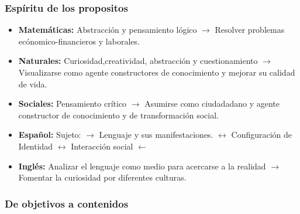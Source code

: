 \documentclass{beamer}
\begin{document}
\begin{frame}
\frametitle{Esp\'iritu de los propositos}
\begin{itemize}
\item \textbf{Matem\'aticas:} Abstracci\'on y pensamiento l\'ogico $\rightarrow$ Resolver problemas ec\'onomico-financieros y laborales. 
\item \textbf{Naturales: } Curiosidad,creatividad, abstracci\'on y cuestionamiento $\rightarrow$  Visualizarse como agente constructores de conocimiento y mejorar su calidad de vida. 
\item \textbf{Sociales:} Pensamiento cr\'itico $\rightarrow$ Asumirse como ciudadadano y agente constructor de conocimiento y de transformaci\'on social. 
\item \textbf{ Espa\~nol:} Sujeto: $\rightarrow $  Lenguaje y sus manifestaciones. $\leftrightarrow$ Configuraci\'on de Identidad $\leftrightarrow$  Interacci\'on social $\leftarrow$
\item \textbf{Ingl\'es: } Analizar el lenguaje como medio para acercarse a la realidad $\rightarrow$  Fomentar la curiosidad por diferentes culturas. 
\end{itemize}
\end{frame}
\begin{frame}
\frametitle{De objetivos a contenidos}
\begin{center}
\end{center}
\end{frame}
\end{document}
